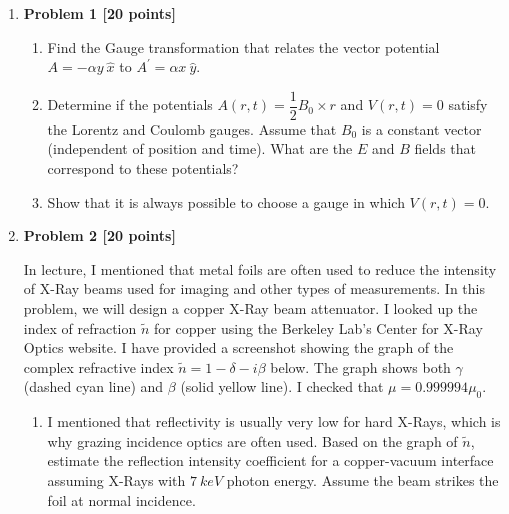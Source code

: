 \documentclass[fleqn]{article}
\begin{document}
  \begin{enumerate}
    \item \textbf{Problem 1 [20 points]}
    \begin{enumerate}
      \item Find the Gauge transformation that relates the vector potential 
      $A=-\alpha y ~ \hat{x}$ to $A^'=\alpha x ~ \hat{y}$.


      \item Determine if the potentials $A(r,t)=\dfrac{1}{2} B_0 \times r$ and $V(r,t)=0$ satisfy the Lorentz 
      and Coulomb gauges. Assume that $B_0$ is a constant vector (independent of position and time). What are
      the $E$ and $B$ fields that correspond to these potentials?


      \item Show that it is always possible to choose a gauge in which $V(r,t)=0$.


    \end{enumerate}

  \item \textbf{Problem 2 [20 points]} 

  In lecture, I mentioned that metal foils are often used to reduce the intensity of X-Ray beams used for imaging 
  and other types of measurements. In this problem, we will design a copper X-Ray beam attenuator. I looked up the 
  index of refraction $\tilde{n}$ for copper using the Berkeley Lab's Center for X-Ray Optics website. I have 
  provided a screenshot showing the graph of the complex refractive index $\tilde{n}=1-\delta -i \beta$ below. The 
  graph shows both $\gamma$ (dashed cyan line) and $\beta$ (solid yellow line). I checked that $\mu=0.999994 \mu_0$.
    \begin{enumerate}
      \item I mentioned that reflectivity is usually very low for hard X-Rays, which is why grazing incidence
      optics are often used. Based on the graph of $\tilde{n}$, estimate the reflection intensity coefficient for a
      copper-vacuum interface assuming X-Rays with $7 ~ keV$ photon energy. Assume the beam strikes the foil at normal 
      incidence.


\end{enumerate}
\end{enumerate}
\end{document}
